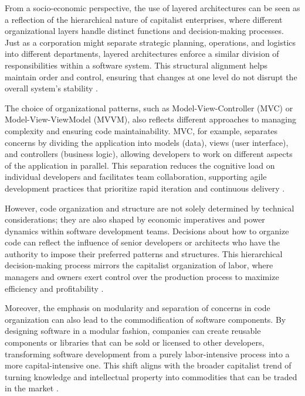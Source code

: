 \begin{refsection}
From a socio-economic perspective, the use of layered architectures can be seen as a reflection of the hierarchical nature of capitalist enterprises, where different organizational layers handle distinct functions and decision-making processes. Just as a corporation might separate strategic planning, operations, and logistics into different departments, layered architectures enforce a similar division of responsibilities within a software system. This structural alignment helps maintain order and control, ensuring that changes at one level do not disrupt the overall system's stability \cite[pp.~65-68]{Pfleeger2010}.

The choice of organizational patterns, such as Model-View-Controller (MVC) or Model-View-ViewModel (MVVM), also reflects different approaches to managing complexity and ensuring code maintainability. MVC, for example, separates concerns by dividing the application into models (data), views (user interface), and controllers (business logic), allowing developers to work on different aspects of the application in parallel. This separation reduces the cognitive load on individual developers and facilitates team collaboration, supporting agile development practices that prioritize rapid iteration and continuous delivery \cite[pp.~112-115]{Fowler2015}.

However, code organization and structure are not solely determined by technical considerations; they are also shaped by economic imperatives and power dynamics within software development teams. Decisions about how to organize code can reflect the influence of senior developers or architects who have the authority to impose their preferred patterns and structures. This hierarchical decision-making process mirrors the capitalist organization of labor, where managers and owners exert control over the production process to maximize efficiency and profitability \cite[pp.~85-88]{Pressman2019}.

Moreover, the emphasis on modularity and separation of concerns in code organization can also lead to the commodification of software components. By designing software in a modular fashion, companies can create reusable components or libraries that can be sold or licensed to other developers, transforming software development from a purely labor-intensive process into a more capital-intensive one. This shift aligns with the broader capitalist trend of turning knowledge and intellectual property into commodities that can be traded in the market \cite[pp.~140-143]{Sommerville2011}.


\end{refsection}
